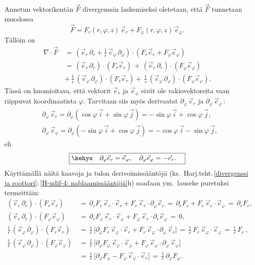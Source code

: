 Annetun vektorikentän $\vec F$ divergenssin laskemiseksi oletetaan, että $\vec F$ tunnetaan
muodossa
\[
\vec F = F_r(r,\varphi,z)\,\vec e_r + F_\varphi(r,\varphi,z)\,\vec e_\varphi.
\]
Tällöin on
\begin{align*}
\nabla\cdot\vec F \,
    &=\,\left(\vec e_r\,\partial_r+\frac{1}{r}\,\vec e_\varphi\,\partial_\varphi\right)
        \cdot(F_r\vec e_r + F_\varphi\vec e_\varphi) \\[3mm]
    &=\,(\vec e_r\,\partial_r)\cdot(F_r\vec e_r)\,
     +\,(\vec e_r\,\partial_r)\cdot(F_\varphi\vec e_\varphi) \\
    &+\,\frac{1}{r}\,(\vec e_\varphi\,\partial_\varphi)\cdot(F_r\vec e_r)
     +\,\frac{1}{r}\,(\vec e_\varphi\,\partial_\varphi)\cdot(F_\varphi\vec e_\varphi).
\end{align*}
Tässä on huomioitava, että vektorit $\vec e_r$ ja $\vec e_\varphi$ eivät ole vakiovektoreita
vaan riippuvat koordinaatista $\varphi$. Tarvitaan siis myös derivaatat 
$\partial_\varphi\,\vec e_r$ ja $\partial_\varphi\,\vec e_\varphi\,$:
\begin{align*}
&\partial_\varphi\,\vec e_r = \partial_\varphi(\cos\varphi\,\vec i+\sin\varphi\,\vec j)
                            = -\sin\varphi\,\vec i+\cos\varphi\,\vec j, \\
&\partial_\varphi\,\vec e_\varphi =\partial_\varphi(-\sin\varphi\,\vec i+\cos\varphi\,\vec j)
                                  = -\cos\varphi\,\vec i-\sin\varphi\,\vec j,
\end{align*}
eli
\[
 \boxed{\kehys\quad \partial_\varphi \vec e_r = \vec e_\varphi, \quad 
                    \partial_\varphi \vec e_\varphi = -\vec e_r. \quad} 
\]
Käyttämällä näitä kaavoja ja tulon derivoimissääntöjä 
(ks.\ Harj.teht.\,\ref{divergenssi ja roottori}:\,\ref{H-udif-4: nablaamissääntöjä}h)
saadaan ym.\ lauseke puretuksi termeittäin:
\begin{align*}
(\vec e_r\,\partial_r)\cdot(F_r\vec e_r)\,
    &=\,\partial_r F_r\,\vec e_r\cdot\vec e_r+F_r\,\vec e_r\cdot\partial_\varphi\vec e_r
   \,=\,\partial_r F_r+F_r\,\vec e_r\cdot\vec e_\varphi  
   \,=\,\partial_r F_r, \\[2mm]
(\vec e_r\,\partial_r)\cdot(F_\varphi\vec e_\varphi)\,
    &=\,\partial_r F_\varphi\,\vec e_r\cdot\vec e_\varphi
                  +F_\varphi\,\vec e_r\cdot\partial_r\vec e_\varphi
   \,=\, 0, \\ 
\frac{1}{r}\,(\vec e_\varphi\,\partial_\varphi)\cdot(F_r\vec e_r)\,
    &=\,\frac{1}{r}\,\bigl[\partial_\varphi F_r\,\vec e_\varphi\cdot\vec e_r
                       +F_r\,\vec e_\varphi\cdot\partial_\varphi\,\vec e_r\bigr]
   \,=\, \frac{1}{r}\,F_r\,\vec e_\varphi\cdot\vec e_\varphi
   \,=\,\frac{1}{r}\,F_r\,, \\
\frac{1}{r}\,(\vec e_\varphi\,\partial_\varphi)\cdot(F_\varphi\vec e_\varphi)\,
    &=\,\frac{1}{r}\,\bigl[\partial_\varphi F_\varphi\,\vec e_\varphi\cdot\vec e_\varphi
                       +F_\varphi\,\vec e_\varphi\cdot\partial_\varphi\,\vec e_\varphi\bigr]\, \\
    &=\,\frac{1}{r}\,\bigl[\partial_\varphi F_\varphi-F_\varphi\,\vec e_\varphi\cdot\vec e_r\bigr]
   \,=\,\frac{1}{r}\,\partial_\varphi F_\varphi.
\end{align*}
